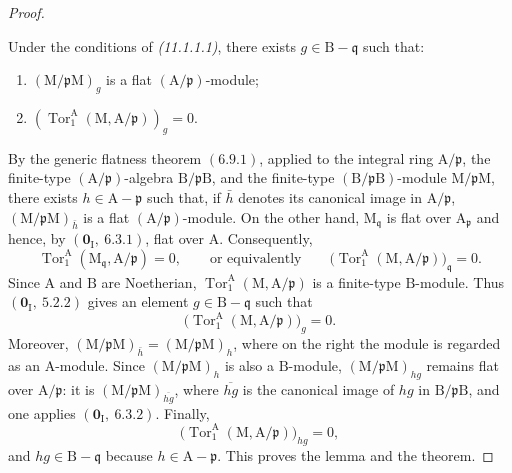 \begin{proof}
\begin{lemma}[11.1.1.2]
\label{IV.11.1.1.2}
Under the conditions of \emph{(11.1.1.1)}, there exists $g\in\mathrm{B}-\mathfrak{q}$ such that:
\begin{enumerate}[label=\emph{\roman*)}]
  \item $(\mathrm{M}/\mathfrak{p}\mathrm{M})_g$ is a flat $(\mathrm{A}/\mathfrak{p})$-module;
  \item $(\operatorname{Tor}_1^\mathrm{A}(\mathrm{M},\mathrm{A}/\mathfrak{p}))_g=0$.
\end{enumerate}
\end{lemma}


By the generic flatness theorem $(6.9.1)$, applied to the integral ring
$\mathrm{A}/\mathfrak{p}$, the finite-type
$(\mathrm{A}/\mathfrak{p})$-algebra
$\mathrm{B}/\mathfrak{p}\mathrm{B}$, and the finite-type
$(\mathrm{B}/\mathfrak{p}\mathrm{B})$-module
$\mathrm{M}/\mathfrak{p}\mathrm{M}$, there exists
$h\in\mathrm{A}-\mathfrak{p}$ such that, if $\bar h$ denotes its canonical
image in $\mathrm{A}/\mathfrak{p}$,
$(\mathrm{M}/\mathfrak{p}\mathrm{M})_{\bar h}$ is a flat
$(\mathrm{A}/\mathfrak{p})$-module. On the other hand,
$\mathrm{M}_{\mathfrak q}$ is flat over $\mathrm{A}_{\mathfrak p}$ and
hence, by $(\mathbf{0}_\mathrm{I},~6.3.1)$, flat over $\mathrm{A}$.
Consequently,
\[
  \operatorname{Tor}_1^\mathrm{A}
  (\mathrm{M}_{\mathfrak q},\mathrm{A}/\mathfrak p)=0,
  \qquad\text{or equivalently}\qquad
  \bigl(\operatorname{Tor}_1^\mathrm{A}
  (\mathrm{M},\mathrm{A}/\mathfrak p)\bigr)_{\mathfrak q}=0.
\]
Since $\mathrm{A}$ and $\mathrm{B}$ are Noetherian,
$\operatorname{Tor}_1^\mathrm{A}
(\mathrm{M},\mathrm{A}/\mathfrak p)$ is a finite-type
$\mathrm{B}$-module. Thus $(\mathbf{0}_\mathrm{I},~5.2.2)$ gives an element
$g\in\mathrm{B}-\mathfrak q$ such that
\[
  \bigl(\operatorname{Tor}_1^\mathrm{A}
  (\mathrm{M},\mathrm{A}/\mathfrak p)\bigr)_g=0.
\]
Moreover,
$(\mathrm{M}/\mathfrak p\mathrm{M})_{\bar h}
=(\mathrm{M}/\mathfrak p\mathrm{M})_h$, where on the right the module is
regarded as an $\mathrm{A}$-module. Since
$(\mathrm{M}/\mathfrak p\mathrm{M})_h$ is also a $\mathrm{B}$-module,
$(\mathrm{M}/\mathfrak p\mathrm{M})_{hg}$ remains flat over
$\mathrm{A}/\mathfrak p$: it is
$(\mathrm{M}/\mathfrak p\mathrm{M})_{\overline{hg}}$, where
$\overline{hg}$ is the canonical image of $hg$ in
$\mathrm{B}/\mathfrak p\mathrm{B}$, and one applies
$(\mathbf{0}_\mathrm{I},~6.3.2)$. Finally,
\[
  \bigl(\operatorname{Tor}_1^\mathrm{A}
  (\mathrm{M},\mathrm{A}/\mathfrak p)\bigr)_{hg}=0,
\]
and $hg\in\mathrm{B}-\mathfrak q$ because
$h\in\mathrm{A}-\mathfrak p$. This proves the lemma and the theorem.
\end{proof}

